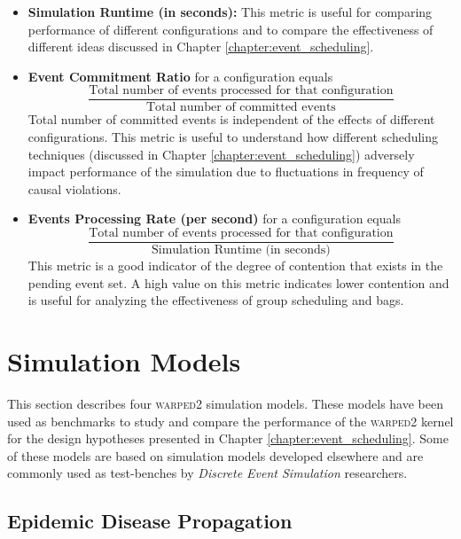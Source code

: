 \documentclass[11pt]{book}
\begin{document}
\begin{itemize}

\item \textbf{Simulation Runtime (in seconds):}  This metric is useful for comparing performance of
  different configurations and to compare the effectiveness of different ideas discussed in Chapter
  \ref{chapter:event_scheduling}.

\item \textbf{Event Commitment Ratio} for a configuration equals
  \begin{equation*}
    \frac{\text{Total number of events processed for that configuration}} {\text{Total number of
        committed events}}
  \end{equation*}
  \noindent
  Total number of committed events is independent of the effects of different configurations.  This metric is
  useful to understand how different scheduling techniques (discussed in Chapter
  \ref{chapter:event_scheduling}) adversely impact performance of the simulation due to fluctuations in
  frequency of causal violations.

\item \textbf{Events Processing Rate (per second)} for a configuration equals
  \begin{equation*}
    \frac{\text{Total number of events processed for that configuration}} {\text{Simulation Runtime
        (in seconds)}}
  \end{equation*}
  \noindent
  This metric is a good indicator of the degree of contention that exists in the pending event set. A high
  value on this metric indicates lower contention and is useful for analyzing the effectiveness of group
  scheduling and bags.
\end{itemize}

\section[Benchmarks]{Simulation Models}\label{sec:simulation_models}

This section describes four \textsc{warped2} simulation models.  These models have been used as benchmarks to
study and compare the performance of the \textsc{warped2} kernel for the design hypotheses presented in
Chapter \ref{chapter:event_scheduling}.  Some of these models are based on simulation models developed
elsewhere and are commonly used as test-benches by \emph{Discrete Event Simulation} researchers.

\subsection{Epidemic Disease Propagation}\label{subsec:epidemic}
\end{document}
